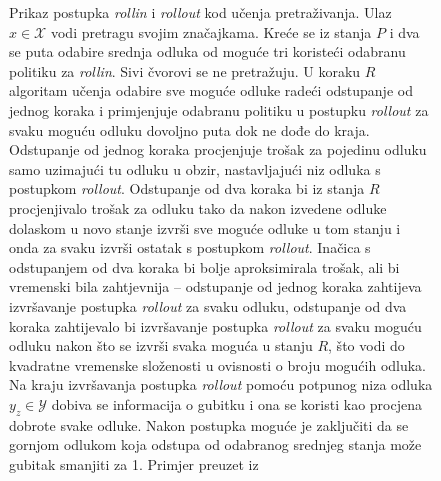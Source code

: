\begin{figure}
\caption[Prikaz postupka \textit{rollin} i \textit{rollout} kod učenja
pretraživanja.]{Prikaz postupka \textit{rollin} i \textit{rollout} kod učenja
pretraživanja. Ulaz $x \in \mathcal{X}$ vodi pretragu svojim značajkama. Kreće
se iz stanja $P$ i dva se puta odabire srednja odluka od moguće tri koristeći
odabranu politiku za \textit{rollin}. Sivi čvorovi se ne pretražuju. U koraku
$R$ algoritam učenja odabire sve moguće odluke radeći odstupanje od jednog
koraka i primjenjuje odabranu politiku u postupku \textit{rollout} za svaku
moguću odluku dovoljno puta dok ne dođe do kraja. Odstupanje od jednog koraka
procjenjuje trošak za pojedinu odluku samo uzimajući tu odluku u obzir,
nastavljajući niz odluka s postupkom \textit{rollout}. Odstupanje od dva koraka
bi iz stanja $R$ procjenjivalo trošak za odluku tako da nakon izvedene odluke
dolaskom u novo stanje izvrši sve moguće odluke u tom stanju i onda za svaku
izvrši ostatak s postupkom \textit{rollout}. Inačica s odstupanjem od dva koraka
bi bolje aproksimirala trošak, ali bi vremenski bila zahtjevnija -- odstupanje
od jednog koraka zahtijeva izvršavanje postupka \textit{rollout} za svaku
odluku, odstupanje od dva koraka zahtijevalo bi izvršavanje postupka
\textit{rollout} za svaku moguću odluku nakon što se izvrši svaka moguća u
stanju $R$, što vodi do kvadratne vremenske složenosti u ovisnosti o broju
mogućih odluka. Na kraju izvršavanja postupka \textit{rollout} pomoću potpunog
niza odluka $y_z \in \mathcal{Y}$ dobiva se informacija o gubitku i ona se
koristi kao procjena dobrote svake odluke. Nakon postupka moguće je zaključiti
da se gornjom odlukom koja odstupa od odabranog srednjeg stanja može gubitak
smanjiti za 1. Primjer preuzet iz \citep[str.~3]{daume15lols}}
\label{fig:rollinout}
\end{figure}

